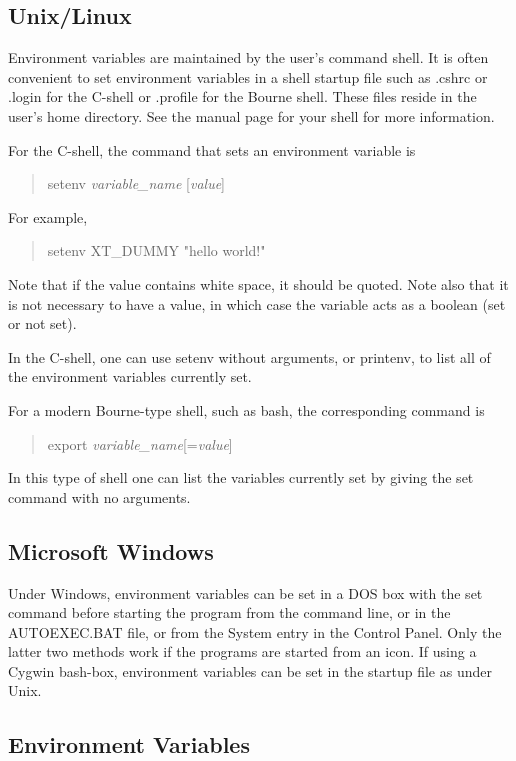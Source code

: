 \subsection{Unix/Linux}

Environment variables are maintained by the user's command shell.  It
is often convenient to set environment variables in a shell startup
file such as {\vt .cshrc} or {\vt .login} for the C-shell or {\vt
.profile} for the Bourne shell.  These files reside in the user's home
directory.  See the manual page for your shell for more information.

For the C-shell, the command that sets an environment variable is
\begin{quote}
{\vt setenv} {\it variable\_name} [{\it value\/}]
\end{quote}
For example,
\begin{quote}
{\vt setenv XT\_DUMMY "hello world!"}
\end{quote}
Note that if the value contains white space, it should be quoted. 
Note also that it is not necessary to have a value, in which case the
variable acts as a boolean (set or not set).

In the C-shell, one can use {\vt setenv} without arguments, or {\vt
printenv}, to list all of the environment variables currently set.

For a modern Bourne-type shell, such as {\vt bash}, the corresponding
command is
\begin{quote}
{\vt export} {\it variable\_name\/}[={\it value\/}]
\end{quote}
In this type of shell one can list the variables currently set by
giving the {\vt set} command with no arguments.

\subsection{Microsoft Windows}

Under Windows, environment variables can be set in a DOS box with the
{\vt set} command before starting the program from the command line,
or in the {\vt AUTOEXEC.BAT} file, or from the {\cb System} entry in
the {\cb Control Panel}.  Only the latter two methods work if the
programs are started from an icon.  If using a Cygwin bash-box,
environment variables can be set in the startup file as under Unix.

\subsection{{\XicTools} Environment Variables}

